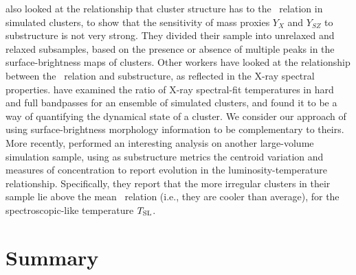 \documentclass{aastex} \usepackage{natbib}
\begin{document}
\cite{2006ApJ...650..128K} also looked at the relationship that
cluster structure has to the \mtx\ relation in simulated clusters, to
show that the sensitivity of mass proxies $Y_X$ and $Y_{SZ}$ to
substructure is not very strong.  They divided their sample into
unrelaxed and relaxed subsamples, based on the presence or absence of
multiple peaks in the surface-brightness maps of clusters.  Other
workers have looked at the relationship between the \mtx\ relation and
substructure, as reflected in the X-ray spectral properties.
\cite{2001ApJ...546..100M} have examined the ratio of X-ray
spectral-fit temperatures in hard and full bandpasses for an ensemble
of simulated clusters, and found it to be a way of quantifying the
dynamical state of a cluster.  We consider our approach of using
surface-brightness morphology information to be complementary to
theirs.  More recently, \cite{2007MNRAS.377..317K} performed an
interesting analysis on another large-volume simulation sample, using
as substructure metrics the centroid variation and measures of
concentration to report evolution in the luminosity-temperature
relationship.  Specifically, they report that the more irregular
clusters in their sample lie above the mean \mtx\ relation (i.e., they
are cooler than average), for the spectroscopic-like temperature
$T_{\rm SL}$.

\section{Summary}
\end{document}
